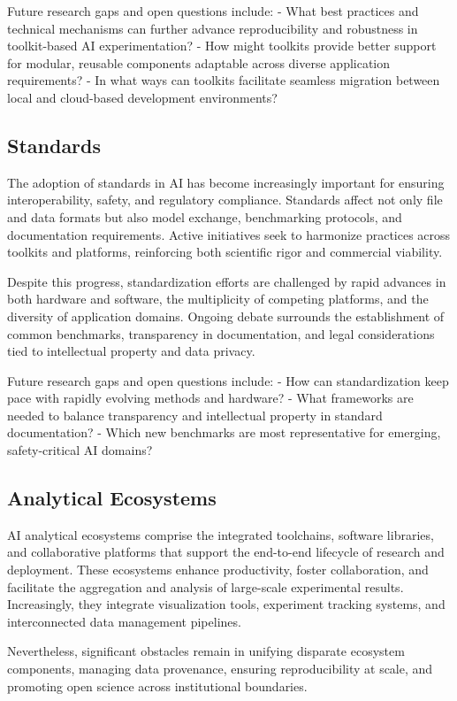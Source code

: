 \documentclass[sigconf]{acmart}
\begin{document}
Future research gaps and open questions include:
- What best practices and technical mechanisms can further advance reproducibility and robustness in toolkit-based AI experimentation?
- How might toolkits provide better support for modular, reusable components adaptable across diverse application requirements?
- In what ways can toolkits facilitate seamless migration between local and cloud-based development environments?

\subsection{Standards}
The adoption of standards in AI has become increasingly important for ensuring interoperability, safety, and regulatory compliance. Standards affect not only file and data formats but also model exchange, benchmarking protocols, and documentation requirements. Active initiatives seek to harmonize practices across toolkits and platforms, reinforcing both scientific rigor and commercial viability.

Despite this progress, standardization efforts are challenged by rapid advances in both hardware and software, the multiplicity of competing platforms, and the diversity of application domains. Ongoing debate surrounds the establishment of common benchmarks, transparency in documentation, and legal considerations tied to intellectual property and data privacy.

Future research gaps and open questions include:
- How can standardization keep pace with rapidly evolving methods and hardware?
- What frameworks are needed to balance transparency and intellectual property in standard documentation?
- Which new benchmarks are most representative for emerging, safety-critical AI domains?

\subsection{Analytical Ecosystems}
AI analytical ecosystems comprise the integrated toolchains, software libraries, and collaborative platforms that support the end-to-end lifecycle of research and deployment. These ecosystems enhance productivity, foster collaboration, and facilitate the aggregation and analysis of large-scale experimental results. Increasingly, they integrate visualization tools, experiment tracking systems, and interconnected data management pipelines.

Nevertheless, significant obstacles remain in unifying disparate ecosystem components, managing data provenance, ensuring reproducibility at scale, and promoting open science across institutional boundaries.
\end{document}
